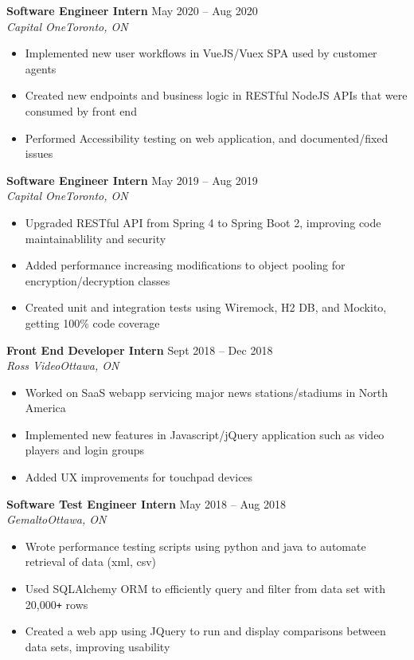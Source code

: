 \documentclass[letterpaper]{article}
\newcommand{\DatedEntry}[5]{\small\textbf{#1}
	\hfill \small{#2}\\
	\textit{#3}\hfill\textit{#4}\\\vspace{0.1cm}
	#5\vspace{0.1cm}
}
\begin{document}
\DatedEntry{Software Engineer Intern}
{May 2020 -- Aug 2020}
{Capital One}
{Toronto, ON}
{\begin{itemize}[nolistsep]
	\item Implemented new user workflows in VueJS/Vuex SPA used by customer agents
	\item Created new endpoints and business logic in RESTful NodeJS APIs that were consumed by front end
	\item Performed Accessibility testing on web application, and documented/fixed issues
\end{itemize}}
\DatedEntry{Software Engineer Intern}
{May 2019 -- Aug 2019}
{Capital One}
{Toronto, ON}
{\begin{itemize}[nolistsep]
	\item Upgraded RESTful API from Spring 4 to Spring Boot 2, improving code maintainablility and security
	\item Added performance increasing modifications to object pooling for encryption/decryption classes
	\item Created unit and integration tests using Wiremock, H2 DB, and Mockito, getting 100\% code coverage
\end{itemize}}
\DatedEntry{Front End Developer Intern}
{Sept 2018 -- Dec 2018}
{Ross Video}
{Ottawa, ON}
{\begin{itemize}[nolistsep]
	\item Worked on SaaS webapp servicing major news stations/stadiums in North America
	\item Implemented new features in Javascript/jQuery application such as video players and login groups
	\item Added UX improvements for touchpad devices
\end{itemize}}
\DatedEntry{Software Test Engineer Intern}
{May 2018 -- Aug 2018}
{Gemalto}
{Ottawa, ON}
{\begin{itemize}[nolistsep]
	\item Wrote performance testing scripts using python and java to automate retrieval of data (xml, csv)
	\item Used SQLAlchemy ORM to efficiently query and filter from data set with 20,000\texttt{+} rows
	\item Created a web app using JQuery to run and display comparisons between data sets, improving usability
\end{itemize}}
\vspace{-0.3cm}
\end{document}
